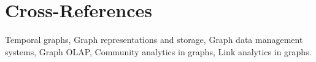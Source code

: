\documentclass[graybox, natbib, nosecnum, twocolumn]{svmult}
\begin{document}
\section{Cross-References}
Temporal graphs, Graph representations and storage, Graph data management systems, Graph OLAP, Community analytics in graphs, Link analytics in graphs.
 
%

\end{document}
